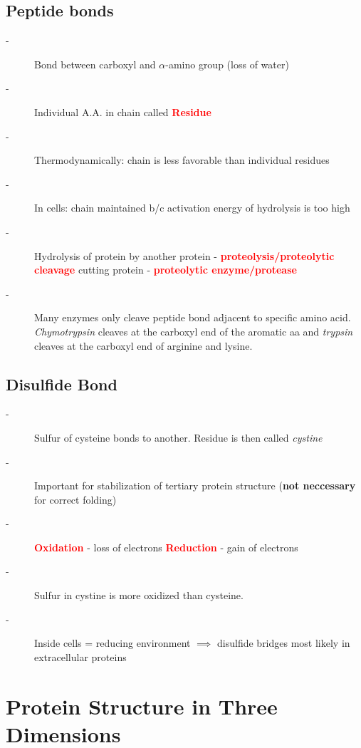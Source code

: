 \documentclass[10pt,a4paper]{report}
\begin{document}
	\subsection{Peptide bonds}
	\begin{description}
		\item[-] Bond between carboxyl and $\alpha$-amino group (loss of water)
		\item[-] Individual A.A. in chain called \textcolor{red}{\textbf{Residue}}
		\item[-] Thermodynamically: chain is less favorable than individual residues
		\item[-] In cells: chain maintained b/c activation energy of hydrolysis is too high
		\item[-] Hydrolysis of protein by another protein - \textcolor{red}{\textbf{proteolysis/proteolytic cleavage}} cutting protein - \textcolor{red}{\textbf{proteolytic enzyme/protease}}
		\item[-] Many enzymes only cleave peptide bond adjacent to specific amino acid. \emph{Chymotrypsin} cleaves at the carboxyl end of the aromatic aa and \emph{trypsin} cleaves at the carboxyl end of arginine and lysine.
	\end{description}
	
	\subsection{Disulfide Bond}
	\begin{description}
		\item[-] Sulfur of cysteine bonds to another. Residue is then called \textit{cystine}
		\item[-] Important for stabilization of tertiary protein structure (\textbf{not neccessary} for correct folding)
		\item[-] \textcolor{red}{\textbf{Oxidation}} - loss of electrons \textcolor{red}{\textbf{Reduction}} - gain of electrons	
		\item[-] Sulfur in cystine is more oxidized than cysteine.
		\item[-] Inside cells = reducing environment $\implies$ disulfide bridges most likely in extracellular proteins
	\end{description}
	
	\section{Protein Structure in Three Dimensions}
	
\end{document}
